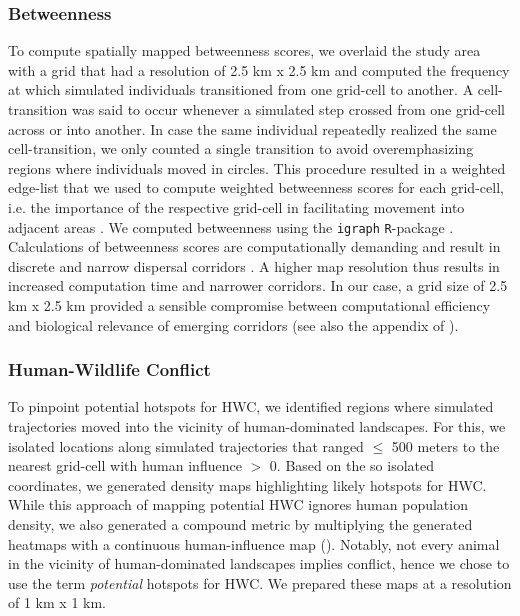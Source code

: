 \documentclass[../FinalThesis.tex]{subfiles}
\begin{document}
\subsubsection{Betweenness}

To compute spatially mapped betweenness scores, we overlaid the study area with
a grid that had a resolution of 2.5 km x 2.5 km and computed the frequency at
which simulated individuals transitioned from one grid-cell to another. A
cell-transition was said to occur whenever a simulated step crossed from one
grid-cell across or into another. In case the same individual repeatedly
realized the same cell-transition, we only counted a single transition to avoid
overemphasizing regions where individuals moved in circles. This procedure
resulted in a weighted edge-list that we used to compute weighted betweenness
scores for each grid-cell, i.e. the importance of the respective grid-cell in
facilitating movement into adjacent areas \citep{Bastille-Rousseau.2018,
Bastille-Rousseau.2020}. We computed betweenness using the \texttt{igraph}
\texttt{R}-package \citep{Csardi.2006}. Calculations of betweenness scores are
computationally demanding and result in discrete and narrow dispersal corridors
\citep{Hofmann.2023}. A higher map resolution thus results in increased
computation time and narrower corridors. In our case, a grid size of 2.5 km x
2.5 km provided a sensible compromise between computational efficiency and
biological relevance of emerging corridors (see also the appendix of
\citealp{Hofmann.2023}).

\subsubsection{Human-Wildlife Conflict}

To pinpoint potential hotspots for HWC, we identified regions where simulated
trajectories moved into the vicinity of human-dominated landscapes. For this, we
isolated locations along simulated trajectories that ranged $\leq$ 500 meters to
the nearest grid-cell with human influence $>$ 0. Based on the so isolated
coordinates, we generated density maps highlighting likely hotspots for HWC.
While this approach of mapping potential HWC ignores human population density,
we also generated a compound metric by multiplying the generated heatmaps with a
continuous human-influence map (). Notably, not every
animal in the vicinity of human-dominated landscapes implies conflict, hence we
chose to use the term \textit{potential} hotspots for HWC. We prepared these
maps at a resolution of 1 km x 1 km.
\end{document}
